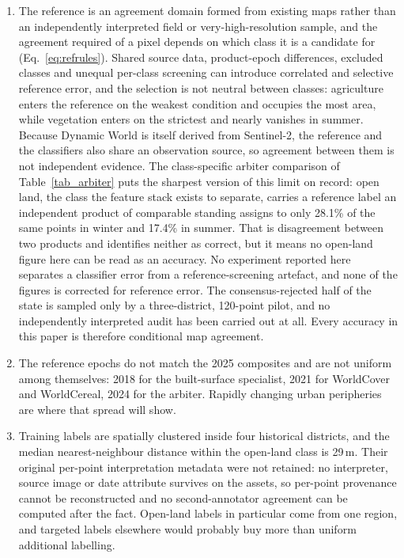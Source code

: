 \documentclass[conference]{IEEEtran}
\begin{document}
\begin{enumerate}
    \item The reference is an agreement domain formed from existing maps rather than an independently interpreted field or very-high-resolution sample, and the agreement required of a pixel depends on which class it is a candidate for (Eq.~\eqref{eq:refrules}). Shared source data, product-epoch differences, excluded classes and unequal per-class screening can introduce correlated and selective reference error, and the selection is not neutral between classes: agriculture enters the reference on the weakest condition and occupies the most area, while vegetation enters on the strictest and nearly vanishes in summer. Because Dynamic World is itself derived from Sentinel-2, the reference and the classifiers also share an observation source, so agreement between them is not independent evidence. The class-specific arbiter comparison of Table~\ref{tab_arbiter} puts the sharpest version of this limit on record: open land, the class the feature stack exists to separate, carries a reference label an independent product of comparable standing assigns to only 28.1\% of the same points in winter and 17.4\% in summer. That is disagreement between two products and identifies neither as correct, but it means no open-land figure here can be read as an accuracy. No experiment reported here separates a classifier error from a reference-screening artefact, and none of the figures is corrected for reference error. The consensus-rejected half of the state is sampled only by a three-district, 120-point pilot, and no independently interpreted audit has been carried out at all. Every accuracy in this paper is therefore conditional map agreement.
    \item The reference epochs do not match the 2025 composites and are not uniform among themselves: 2018 for the built-surface specialist, 2021 for WorldCover and WorldCereal, 2024 for the arbiter. Rapidly changing urban peripheries are where that spread will show.
    \item Training labels are spatially clustered inside four historical districts, and the median nearest-neighbour distance within the open-land class is 29\,m. Their original per-point interpretation metadata were not retained: no interpreter, source image or date attribute survives on the assets, so per-point provenance cannot be reconstructed and no second-annotator agreement can be computed after the fact. Open-land labels in particular come from one region, and targeted labels elsewhere would probably buy more than uniform additional labelling.

\end{enumerate}
\end{document}
